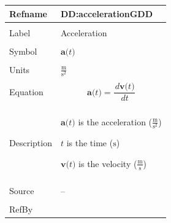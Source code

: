 \documentclass[12pt]{article}
\begin{document}
\vspace{\baselineskip}
\noindent
\begin{minipage}{\textwidth}
\begin{tabular}{>{\raggedright}p{}>{\raggedright\arraybackslash}p{}}
\toprule \textbf{Refname} & \textbf{DD:accelerationGDD}
\label{DD:accelerationGDD}
\\ \midrule \\
Label & Acceleration
        
\\ \midrule \\
Symbol & $\symbf{a}\text{(}t\text{)}$
         
\\ \midrule \\
Units & $\frac{\text{m}}{\text{s}^{2}}$
        
\\ \midrule \\
Equation & \begin{displaymath}
           \symbf{a}\text{(}t\text{)}=\frac{\,d\symbf{v}\text{(}t\text{)}}{\,dt}
           \end{displaymath}
\\ \midrule \\
Description & \begin{symbDescription}
              \item{$\symbf{a}\text{(}t\text{)}$ is the acceleration ($\frac{\text{m}}{\text{s}^{2}}$)}
              \item{$t$ is the time (${\text{s}}$)}
              \item{$\symbf{v}\text{(}t\text{)}$ is the velocity ($\frac{\text{m}}{\text{s}}$)}
              \end{symbDescription}
\\ \midrule \\
Source & --
         
\\ \midrule \\
RefBy & 
\\ \bottomrule
\end{tabular}
\end{minipage}
\end{document}
